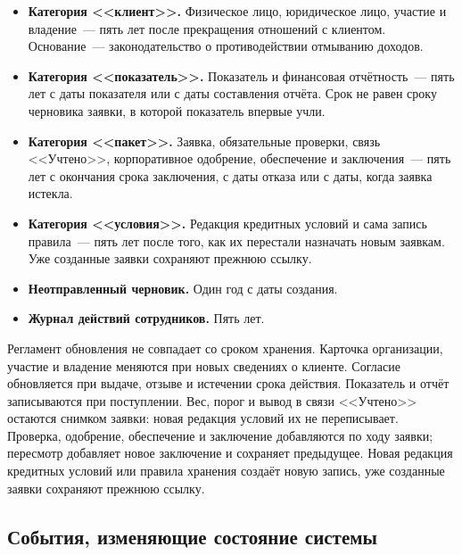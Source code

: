 \begin{itemize}
\item \textbf{Категория <<клиент>>.} Физическое лицо, юридическое лицо, участие и владение~--- пять лет после прекращения отношений с клиентом. Основание~--- законодательство о противодействии отмыванию доходов.
\item \textbf{Категория <<показатель>>.} Показатель и финансовая отчётность~--- пять лет с даты показателя или с даты составления отчёта. Срок не равен сроку черновика заявки, в которой показатель впервые учли.
\item \textbf{Категория <<пакет>>.} Заявка, обязательные проверки, связь <<Учтено>>, корпоративное одобрение, обеспечение и заключения~--- пять лет с окончания срока заключения, с даты отказа или с даты, когда заявка истекла.
\item \textbf{Категория <<условия>>.} Редакция кредитных условий и сама запись правила~--- пять лет после того, как их перестали назначать новым заявкам. Уже созданные заявки сохраняют прежнюю ссылку.
\item \textbf{Неотправленный черновик.} Один год с даты создания.
\item \textbf{Журнал действий сотрудников.} Пять лет.
\end{itemize}

Регламент обновления не совпадает со сроком хранения. Карточка организации, участие и владение меняются при новых сведениях о клиенте. Согласие обновляется при выдаче, отзыве и истечении срока действия. Показатель и отчёт записываются при поступлении. Вес, порог и вывод в связи <<Учтено>> остаются снимком заявки: новая редакция условий их не переписывает. Проверка, одобрение, обеспечение и заключение добавляются по ходу заявки; пересмотр добавляет новое заключение и сохраняет предыдущее. Новая редакция кредитных условий или правила хранения создаёт новую запись, уже созданные заявки сохраняют прежнюю ссылку.

\subsection{События, изменяющие состояние системы}

